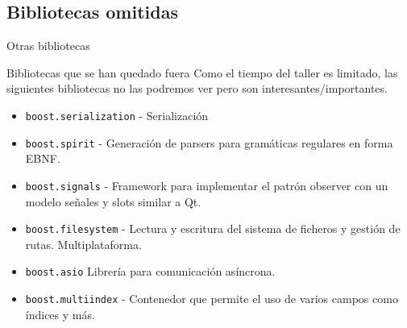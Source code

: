 \documentclass[8pt,xcolor=svgnames]{beamer}
\begin{document}
\subsection{Bibliotecas omitidas}

\begin{frame}{Otras bibliotecas}
  \begin{block}{Bibliotecas que se han quedado fuera}
    Como el tiempo del taller es limitado, las siguientes bibliotecas
    no las podremos ver pero son interesantes/importantes.
    \begin{itemize}
    \item \texttt{boost.serialization} - Serialización
    \item \texttt{boost.spirit} - Generación de parsers para
      gramáticas regulares en forma EBNF.
    \item \texttt{boost.signals} - Framework para implementar el
      patrón observer con un modelo señales y slots similar a Qt.
    \item \texttt{boost.filesystem} - Lectura y escritura del sistema de
      ficheros y gestión de rutas. Multiplataforma.
    \item \texttt{boost.asio} Librería para comunicación asíncrona.
    \item \texttt{boost.multiindex} - Contenedor que permite el uso de
      varios campos como índices y más.
    \end{itemize}
  \end{block}
\end{frame}
\end{document}
